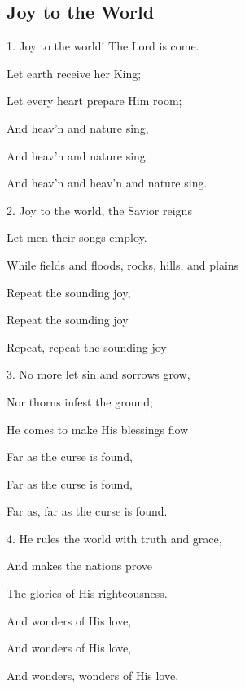 \subsection{Joy to the World}\label{joy_to}
\begin{description}[nosep,leftmargin=\parindent,labelsep=0pt]
\item 1. Joy to the world! The Lord is come. 
\item Let earth receive her King; 
\item Let every heart prepare Him room; 
\item And heav’n and nature sing, 
\item And heav’n and nature sing. 
\item And heav’n and heav’n and nature sing. 
\vspace{1.5ex}
\item 2. Joy to the world, the Savior reigns 
\item Let men their songs employ. 
\item While fields and floods, rocks, hills, and plains 
\item Repeat the sounding joy, 
\item Repeat the sounding joy 
\item Repeat, repeat the sounding joy 
\vspace{1.5ex}
\item 3. No more let sin and sorrows grow, 
\item Nor thorns infest the ground; 
\item He comes to make His blessings flow 
\item Far as the curse is found, 
\item Far as the curse is found, 
\item Far as, far as the curse is found. 
\vspace{1.5ex}
\item 4. He rules the world with truth and grace, 
\item And makes the nations prove 
\item The glories of His righteousness. 
\item And wonders of His love, 
\item And wonders of His love, 
\item And wonders, wonders of His love. 
\end{description}
